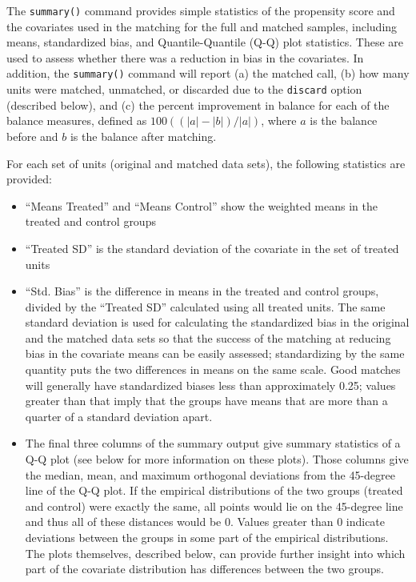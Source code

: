 \documentclass[oneside,letterpaper,titlepage]{article}
\begin{document}
The \texttt{summary()} command provides simple statistics of the
propensity score and the covariates used in the matching for the full
and matched samples, including means, standardized bias, and
Quantile-Quantile (Q-Q) plot statistics.  These are used to assess
whether there was a reduction in bias in the covariates. In addition,
the \texttt{summary()} command will report (a) the matched call, (b)
how many units were matched, unmatched, or discarded due to the
\texttt{discard} option (described below), and (c) the percent
improvement in balance for each of the balance measures, defined as
$100((|a|-|b|)/|a|)$, where $a$ is the balance before and $b$ is the
balance after matching.

For each set of units (original and matched data sets), the following
statistics are provided: 
\begin{itemize}
\item ``Means Treated'' and ``Means Control'' show the weighted means in the treated and control groups
\item ``Treated SD'' is the standard deviation of the covariate in the set
of treated units
\item ``Std. Bias'' is the difference in means in the
treated and control groups, divided by the ``Treated SD'' calculated
using all treated units.  The same standard deviation is used for
calculating the standardized bias in the original and the matched data
sets so that the success of the matching at reducing bias in the
covariate means can be easily assessed; standardizing by the same
quantity puts the two differences in means on the same scale.  Good
matches will generally have standardized biases less than
approximately 0.25; values greater than that imply that the groups
have means that are more than a quarter of a standard deviation apart.
\item The final three columns of the summary output give summary statistics
of a Q-Q plot (see below for more information on these plots). Those
columns give the median, mean, and maximum orthogonal deviations from
the 45-degree line of the Q-Q plot.  If the empirical distributions of
the two groups (treated and control) were exactly the same, all points
would lie on the 45-degree line and thus all of these distances would
be 0.  Values greater than 0 indicate deviations between the groups in
some part of the empirical distributions.  The plots themselves,
described below, can provide further insight into which part of the
covariate distribution has differences between the two groups.
\end{itemize}
\end{document}
